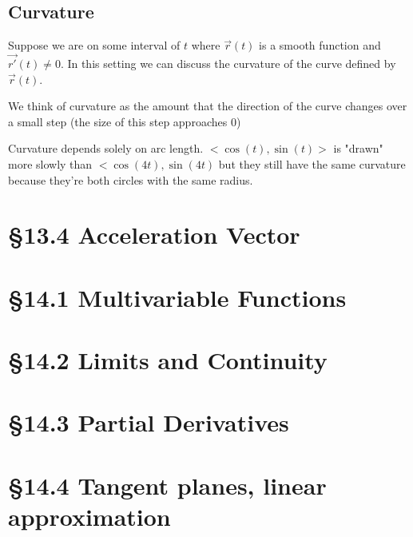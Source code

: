 \documentclass[12 pt]{article}
\begin{document}
        \subsection{Curvature}

        Suppose we are on some interval of $t$ where $\vec{r}(t)$ is a smooth function and $\vec{r'}(t)\neq 0$. In this setting we can discuss the curvature of the curve defined by $\vec{r}(t)$.

        We think of curvature as the amount that the direction of the curve changes over a small step (the size of this step approaches 0)

        Curvature depends solely on arc length. $<\cos(t),\sin(t)>$ is "drawn" more slowly than $<\cos(4t),\sin(4t)$ but they still have the same curvature because they're both circles with the same radius.
    \section{\S 13.4 Acceleration Vector}
    \section{\S 14.1 Multivariable Functions}
    \section{\S 14.2 Limits and Continuity}
    \section{\S 14.3 Partial Derivatives}
    \section{\S 14.4 Tangent planes, linear approximation}
\end{document}
